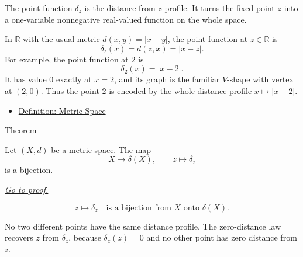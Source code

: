 \begin{remark*}[Interpretation]
The point function \(\delta_z\) is the distance-from-\(z\) profile.  It turns
the fixed point \(z\) into a one-variable nonnegative real-valued function on
the whole space.
\end{remark*}

\begin{remark*}[Examples]
In \(\mathbb{R}\) with the usual metric \(d(x,y)=|x-y|\), the point function
at \(z\in\mathbb{R}\) is
\[
  \delta_z(x)=d(z,x)=|x-z|.
\]
For example, the point function at \(2\) is
\[
  \delta_2(x)=|x-2|.
\]
It has value \(0\) exactly at \(x=2\), and its graph is the familiar
\(V\)-shape with vertex at \((2,0)\).  Thus the point \(2\) is encoded by the
whole distance profile \(x\mapsto |x-2|\).
\end{remark*}

\begin{dependencies}
\begin{itemize}
  \item \hyperref[def:metric-space]{Definition: Metric Space}
\end{itemize}
\end{dependencies}

\begin{theorembox}{Theorem}
\begin{theorem}
\label{thm:metric-point-functions-identify-points}
Let \((X,d)\) be a metric space.  The map
\[
  X\to\delta(X),
  \qquad
  z\mapsto\delta_z
\]
is a bijection.

\smallskip
\noindent
\hyperref[prf:metric-point-functions-identify-points]{\textit{Go to proof.}}
\end{theorem}
\end{theorembox}


\begin{remark*}
\[
z\mapsto\delta_z
\quad\text{is a bijection from }X\text{ onto }\delta(X).
\]
\end{remark*}

\begin{remark*}[Interpretation]
No two different points have the same distance profile.  The zero-distance
law recovers \(z\) from \(\delta_z\), because \(\delta_z(z)=0\) and no other
point has zero distance from \(z\).
\end{remark*}

